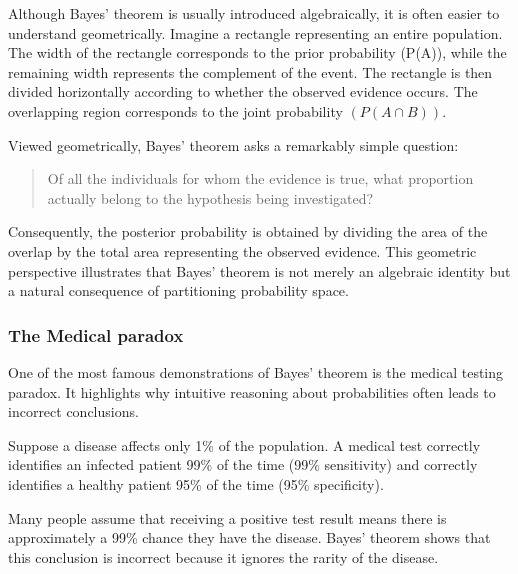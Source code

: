 Although Bayes' theorem is usually introduced algebraically, it is often easier to understand geometrically. Imagine a rectangle representing an entire population. The width of the rectangle corresponds to the prior probability (P(A)), while the remaining width represents the complement of the event. The rectangle is then divided horizontally according to whether the observed evidence occurs. The overlapping region corresponds to the joint probability $(P(A\cap B)).$


Viewed geometrically, Bayes' theorem asks a remarkably simple question:
\begin{quote}
    Of all the individuals for whom the evidence is true, what proportion actually belong to the hypothesis being investigated?
\end{quote}

Consequently, the posterior probability is obtained by dividing the area of the overlap by the total area representing the observed evidence. This geometric perspective illustrates that Bayes' theorem is not merely an algebraic identity but a natural consequence of partitioning probability space.

\subsubsection{The Medical paradox}
One of the most famous demonstrations of Bayes' theorem is the medical testing paradox. It highlights why intuitive reasoning about probabilities often leads to incorrect conclusions.

Suppose a disease affects only 1\% of the population. A medical test correctly identifies an infected patient 99\% of the time (99\% sensitivity) and correctly identifies a healthy patient 95\% of the time (95\% specificity).

Many people assume that receiving a positive test result means there is approximately a 99\% chance they have the disease. Bayes' theorem shows that this conclusion is incorrect because it ignores the rarity of the disease.

%

